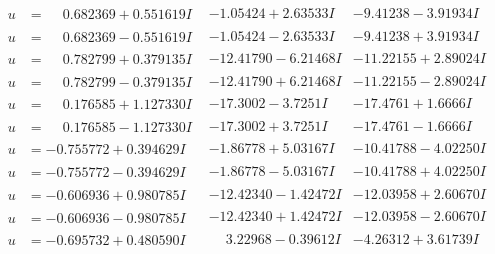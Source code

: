 \documentclass[1p]{elsarticle_modified}
\theoremstyle{definition}
\begin{document}
$$\begin{array}{c|c|c}
\begin{aligned}
u &= \phantom{-}0.682369 + 0.551619 I\end{aligned}
 & -1.05424 + 2.63533 I & -9.41238 - 3.91934 I \\ \hline\begin{aligned}
u &= \phantom{-}0.682369 - 0.551619 I\end{aligned}
 & -1.05424 - 2.63533 I & -9.41238 + 3.91934 I \\ \hline\begin{aligned}
u &= \phantom{-}0.782799 + 0.379135 I\end{aligned}
 & -12.41790 - 6.21468 I & -11.22155 + 2.89024 I \\ \hline\begin{aligned}
u &= \phantom{-}0.782799 - 0.379135 I\end{aligned}
 & -12.41790 + 6.21468 I & -11.22155 - 2.89024 I \\ \hline\begin{aligned}
u &= \phantom{-}0.176585 + 1.127330 I\end{aligned}
 & -17.3002 - 3.7251 I & -17.4761 + 1.6666 I \\ \hline\begin{aligned}
u &= \phantom{-}0.176585 - 1.127330 I\end{aligned}
 & -17.3002 + 3.7251 I & -17.4761 - 1.6666 I \\ \hline\begin{aligned}
u &= -0.755772 + 0.394629 I\end{aligned}
 & -1.86778 + 5.03167 I & -10.41788 - 4.02250 I \\ \hline\begin{aligned}
u &= -0.755772 - 0.394629 I\end{aligned}
 & -1.86778 - 5.03167 I & -10.41788 + 4.02250 I \\ \hline\begin{aligned}
u &= -0.606936 + 0.980785 I\end{aligned}
 & -12.42340 - 1.42472 I & -12.03958 + 2.60670 I \\ \hline\begin{aligned}
u &= -0.606936 - 0.980785 I\end{aligned}
 & -12.42340 + 1.42472 I & -12.03958 - 2.60670 I \\ \hline\begin{aligned}
u &= -0.695732 + 0.480590 I\end{aligned}
 & \phantom{-}3.22968 - 0.39612 I & -4.26312 + 3.61739 I \\ \hline\begin{aligned}

\end{aligned}
\end{array}$$
\end{document}
